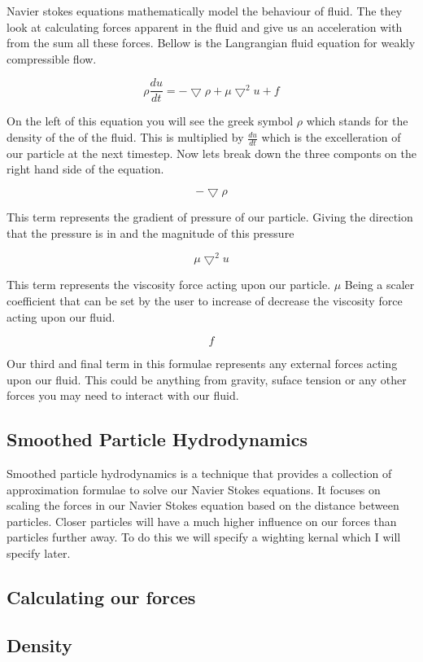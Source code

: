 Navier stokes equations mathematically model the behaviour of fluid. The they look at calculating forces apparent in the fluid and give us an acceleration with from the sum all these forces. Bellow is the Langrangian fluid equation for weakly compressible flow.\par
 \[ \rho\frac{du}{dt}=-\bigtriangledown\rho+\mu\bigtriangledown^2 u + f \]\par
 On the left of this equation you will see the greek symbol $\rho$ which stands for the density of the of the fluid. This is multiplied by $\frac{du}{dt}$ which is the excelleration of our particle at the next timestep. Now lets break down the three componts on the right hand side of the equation.\par
 \[ -\bigtriangledown\rho \]\par
 This term represents the gradient of pressure of our particle. Giving the direction that the pressure is in and the magnitude of this pressure\par
 \[ \mu\bigtriangledown^2 u \]\par
This term represents the viscosity force acting upon our particle. $\mu$ Being a scaler coefficient that can be set by the user to increase of decrease the viscosity force acting upon our fluid.\par
 \[ f \]\par
Our third and final term in this formulae represents any external forces acting upon our fluid. This could be anything from gravity, suface tension or any other forces you may need to interact with our fluid.

\subsection*{Smoothed Particle Hydrodynamics }

Smoothed particle hydrodynamics is a technique that provides a collection of approximation formulae to solve our Navier Stokes equations. It focuses on scaling the forces in our Navier Stokes equation based on the distance between particles. Closer particles will have a much higher influence on our forces than particles further away. To do this we will specify a wighting kernal which I will specify later.

\subsection*{Calculating our forces }

\subsection*{Density }

